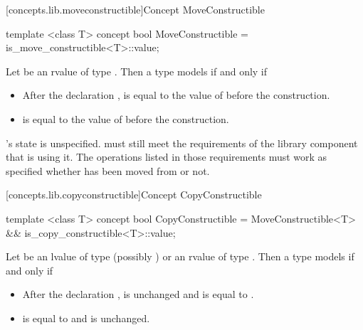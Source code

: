 \begin{addedblock}
[concepts.lib.moveconstructible]{Concept MoveConstructible}

%
\begin{itemdecl}
template <class T>
concept bool MoveConstructible =
  is_move_constructible<T>::value;
\end{itemdecl}

\begin{itemdescr}
\pnum
Let  be an rvalue of type . Then a type  models
 if and only if

\begin{itemize}
\item After the declaration ,  is equal to the value of
 before the construction.
\item {} is equal to the value of  before the construction.
\end{itemize}

\pnum
{}'s state is unspecified. \enternote {} must still meet the
requirements of the library component that is using it. The operations listed
in those requirements must work as specified whether  has been moved
from or not.\exitnote
\end{itemdescr}

[concepts.lib.copyconstructible]{Concept CopyConstructible}

%
\begin{itemdecl}
template <class T>
concept bool CopyConstructible =
  MoveConstructible<T> && is_copy_constructible<T>::value;
\end{itemdecl}

\begin{itemdescr}
\pnum
Let  be an lvalue of type (possibly )  or an rvalue
of type . Then a type  models  if
and only if

\begin{itemize}
\item After the declaration ,  is unchanged and is equal
to .
\item {} is equal to  and  is unchanged.
\end{itemize}
\end{itemdescr}


\end{addedblock}
